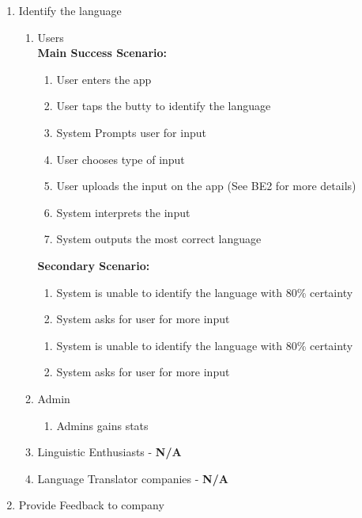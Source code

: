 \begin{enumerate}[{\bf BE1.}]
	\item Identify the language
		\begin{enumerate}[{\bf VP1.}]
			\item Users \\
				\textbf{Main Success Scenario:}
					\begin{enumerate}[{\bf 1.}]
						\item User enters the app
						\item User taps the butty to identify the language
							\item System Prompts user for input
							\item User chooses type of input
							\item User uploads the input on the app (See BE2 for more details)
							\item System interprets the input
							\item System outputs the most correct language
					\end{enumerate}
					\textbf{Secondary Scenario:}
					\begin{enumerate}[{\bf 7.i.}]
						\item System is unable to identify the language with 80\% certainty
						\item System asks for user for more input
					\end{enumerate} 
					\begin{enumerate}[{\bf 8.}]
						\item System is unable to identify the language with 80\% certainty
						\item System asks for user for more input
					\end{enumerate} 
			\item Admin
				\begin{enumerate}[resume]
					\item Admins gains stats
				\end{enumerate}
			\item Linguistic Enthusiasts - \textbf{N/A}
			\item Language Translator companies - \textbf{N/A}
		\end{enumerate}
	\item Provide Feedback to company
\end{enumerate}



